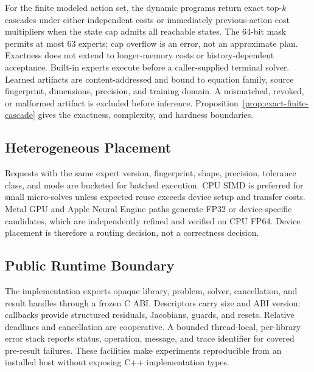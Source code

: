 For the finite modeled action set, the dynamic programs return exact top-$k$ cascades
under either independent costs or immediately previous-action cost multipliers when
the state cap admits all reachable states. The 64-bit mask permits at most 63 experts;
cap overflow is an error, not an approximate plan. Exactness does not extend to
longer-memory costs or history-dependent acceptance. Built-in experts execute before a caller-supplied terminal solver. Learned artifacts are content-addressed and
bound to equation family, source fingerprint, dimensions, precision, and training
domain. A mismatched, revoked, or malformed artifact is excluded before inference.
Proposition~\ref{prop:exact-finite-cascade} gives the exactness, complexity, and
hardness boundaries.

\subsection{Heterogeneous Placement}

Requests with the same expert version, fingerprint, shape, precision, tolerance
class, and mode are bucketed for batched execution. CPU SIMD is preferred for small
micro-solves unless expected reuse exceeds device setup and transfer costs. Metal
GPU and Apple Neural Engine paths generate FP32 or device-specific candidates,
which are independently refined and verified on CPU FP64. Device placement is
therefore a routing decision, not a correctness decision.

\subsection{Public Runtime Boundary}

The implementation exports opaque library, problem, solver, cancellation, and
result handles through a frozen C ABI. Descriptors carry size and ABI version;
callbacks provide structured residuals, Jacobians, guards, and resets. Relative
deadlines and cancellation are cooperative. A bounded thread-local, per-library
error stack reports status, operation, message, and trace identifier for covered
pre-result failures. These facilities make experiments reproducible from an
installed host without exposing C++ implementation types.
